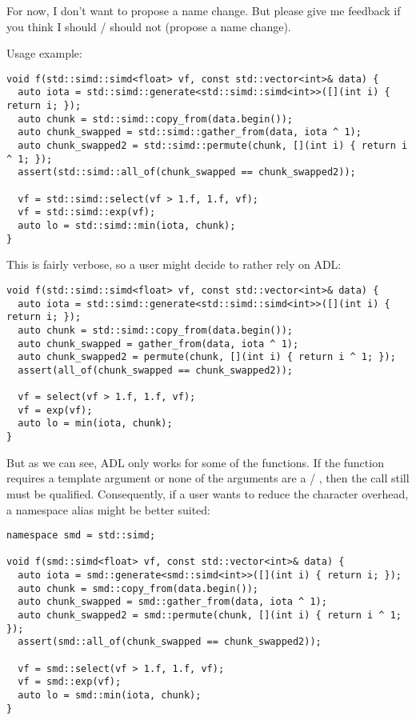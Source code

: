 For now, I don't want to propose a name change.
But please give me feedback if you think I should / should not (propose a name
change).

Usage example:
\medskip\begin{lstlisting}[style=Vc]
void f(std::simd::simd<float> vf, const std::vector<int>& data) {
  auto iota = std::simd::generate<std::simd::simd<int>>([](int i) { return i; });
  auto chunk = std::simd::copy_from(data.begin());
  auto chunk_swapped = std::simd::gather_from(data, iota ^ 1);
  auto chunk_swapped2 = std::simd::permute(chunk, [](int i) { return i ^ 1; });
  assert(std::simd::all_of(chunk_swapped == chunk_swapped2));

  vf = std::simd::select(vf > 1.f, 1.f, vf);
  vf = std::simd::exp(vf);
  auto lo = std::simd::min(iota, chunk);
}
\end{lstlisting}

This is fairly verbose, so a user might decide to rather rely on ADL:
\medskip\begin{lstlisting}[style=Vc]
void f(std::simd::simd<float> vf, const std::vector<int>& data) {
  auto iota = std::simd::generate<std::simd::simd<int>>([](int i) { return i; });
  auto chunk = std::simd::copy_from(data.begin());
  auto chunk_swapped = gather_from(data, iota ^ 1);
  auto chunk_swapped2 = permute(chunk, [](int i) { return i ^ 1; });
  assert(all_of(chunk_swapped == chunk_swapped2));

  vf = select(vf > 1.f, 1.f, vf);
  vf = exp(vf);
  auto lo = min(iota, chunk);
}
\end{lstlisting}

But as we can see, ADL only works for some of the functions.
If the function requires a template argument or none of the arguments are a
\simd / \mask, then the call still must be qualified.
Consequently, if a user wants to reduce the character overhead, a namespace
alias might be better suited:
\medskip\begin{lstlisting}[style=Vc]
namespace smd = std::simd;

void f(smd::simd<float> vf, const std::vector<int>& data) {
  auto iota = smd::generate<smd::simd<int>>([](int i) { return i; });
  auto chunk = smd::copy_from(data.begin());
  auto chunk_swapped = smd::gather_from(data, iota ^ 1);
  auto chunk_swapped2 = smd::permute(chunk, [](int i) { return i ^ 1; });
  assert(smd::all_of(chunk_swapped == chunk_swapped2));

  vf = smd::select(vf > 1.f, 1.f, vf);
  vf = smd::exp(vf);
  auto lo = smd::min(iota, chunk);
}
\end{lstlisting}

